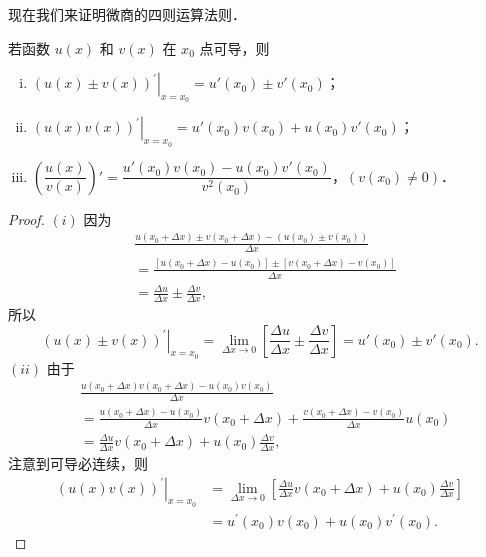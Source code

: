 现在我们来证明微商的四则运算法则．

\begin{theorem}\label{thm:4-2}
若函数 $u(x)$ 和 $v(x)$ 在 $x_0$ 点可导，则
\begin{enumerate}[(i)]
\item $\left.\left(u(x) \pm v(x)\right)^{\prime}\right|_{x=x_0} = u'(x_0) \pm v'(x_0)$；
\item $\left.\left(u(x)v(x)\right)^{\prime}\right|_{x=x_0} = u'(x_0)v(x_0) + u(x_0)v'(x_0)$；
\item $\left(\dfrac{u(x)}{v(x)}\right)' = \dfrac{u'(x_0)v(x_0) - u(x_0)v'(x_0)}{v^2(x_0)}$，$\left(v(x_0) \neq 0\right)$．
\end{enumerate}
\end{theorem}

\begin{proof}
$(i)$ 因为
\[
\begin{aligned}
&\frac{u\left(x_0+\Delta x\right) \pm v\left(x_0+\Delta x\right) - \left(u\left(x_0\right) \pm v\left(x_0\right)\right)}{\Delta x}\\
&= \frac{\left[u\left(x_0+\Delta x\right) - u\left(x_0\right)\right] \pm \left[v\left(x_0+\Delta x\right) - v\left(x_0\right)\right]}{\Delta x}\\
&= \frac{\Delta u}{\Delta x} \pm \frac{\Delta v}{\Delta x},
\end{aligned}
\]
所以
\[
\left.\left(u(x) \pm v(x)\right)^{\prime}\right|_{x=x_0} = \lim_{\Delta x \to 0}\left[\frac{\Delta u}{\Delta x} \pm \frac{\Delta v}{\Delta x}\right] = u'(x_0) \pm v'(x_0).
\]
$(ii)$ 由于
\[
\begin{aligned}
&\frac{u\left(x_0+\Delta x\right)v\left(x_0+\Delta x\right) - u\left(x_0\right)v\left(x_0\right)}{\Delta x}\\
&= \frac{u\left(x_0+\Delta x\right) - u\left(x_0\right)}{\Delta x}v\left(x_0+\Delta x\right) + \frac{v\left(x_0+\Delta x\right) - v\left(x_0\right)}{\Delta x}u\left(x_0\right)\\
&= \frac{\Delta u}{\Delta x}v\left(x_0+\Delta x\right) + u\left(x_0\right)\frac{\Delta v}{\Delta x},
\end{aligned}
\]
注意到可导必连续，则
\[
\begin{aligned}
\left.\left(u\left(x\right)v\left(x\right)\right)^{\prime}\right|_{x=x_0} &= \lim_{\Delta x\to 0}\left[\frac{\Delta u}{\Delta x}v\left(x_0+\Delta x\right) + u\left(x_0\right)\frac{\Delta v}{\Delta x}\right]\\
&= u^{\prime}\left(x_0\right)v\left(x_0\right) + u\left(x_0\right)v^{\prime}\left(x_0\right).

\end{aligned}\]
\end{proof}
